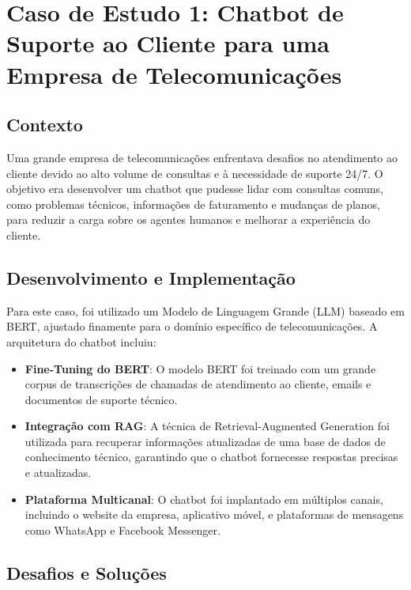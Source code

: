 \documentclass[14pt,a4paper,oneside]{book}
\begin{document}
\section{Caso de Estudo 1: Chatbot de Suporte ao Cliente para uma Empresa de Telecomunicações}

\subsection{Contexto}

Uma grande empresa de telecomunicações enfrentava desafios no atendimento ao cliente devido ao alto volume de consultas e à necessidade de suporte 24/7. O objetivo era desenvolver um chatbot que pudesse lidar com consultas comuns, como problemas técnicos, informações de faturamento e mudanças de planos, para reduzir a carga sobre os agentes humanos e melhorar a experiência do cliente.

\subsection{Desenvolvimento e Implementação}

Para este caso, foi utilizado um Modelo de Linguagem Grande (LLM) baseado em BERT, ajustado finamente para o domínio específico de telecomunicações. A arquitetura do chatbot incluiu:

\begin{itemize}
	\item \textbf{Fine-Tuning do BERT}: O modelo BERT foi treinado com um grande corpus de transcrições de chamadas de atendimento ao cliente, emails e documentos de suporte técnico.
	\item \textbf{Integração com RAG}: A técnica de Retrieval-Augmented Generation foi utilizada para recuperar informações atualizadas de uma base de dados de conhecimento técnico, garantindo que o chatbot fornecesse respostas precisas e atualizadas.
	\item \textbf{Plataforma Multicanal}: O chatbot foi implantado em múltiplos canais, incluindo o website da empresa, aplicativo móvel, e plataformas de mensagens como WhatsApp e Facebook Messenger.
\end{itemize}

\subsection{Desafios e Soluções}
\end{document}

